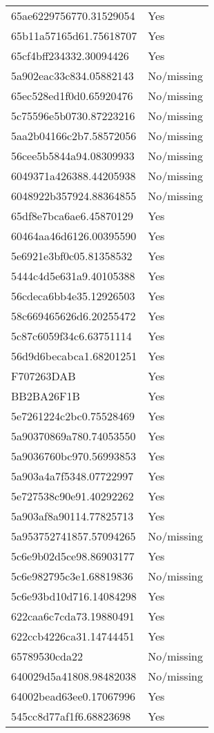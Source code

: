 \begin{tabular}{ll}
65ae6229756770.31529054 & Yes \\
65b11a57165d61.75618707 & Yes \\
65cf4bff234332.30094426 & Yes \\
5a902eac33c834.05882143 & No/missing \\
65ec528ed1f0d0.65920476 & No/missing \\
5c75596e5b0730.87223216 & No/missing \\
5aa2b04166c2b7.58572056 & No/missing \\
56cee5b5844a94.08309933 & No/missing \\
6049371a426388.44205938 & No/missing \\
6048922b357924.88364855 & No/missing \\
65df8e7bca6ae6.45870129 & Yes \\
60464aa46d6126.00395590 & Yes \\
5e6921e3bf0c05.81358532 & Yes \\
5444c4d5e631a9.40105388 & Yes \\
56cdeca6bb4e35.12926503 & Yes \\
58c669465626d6.20255472 & Yes \\
5c87c6059f34c6.63751114 & Yes \\
56d9d6becabca1.68201251 & Yes \\
F707263DAB & Yes \\
BB2BA26F1B & Yes \\
5e7261224c2bc0.75528469 & Yes \\
5a90370869a780.74053550 & Yes \\
5a9036760bc970.56993853 & Yes \\
5a903a4a7f5348.07722997 & Yes \\
5e727538c90e91.40292262 & Yes \\
5a903af8a90114.77825713 & Yes \\
5a953752741857.57094265 & No/missing \\
5c6e9b02d5ce98.86903177 & Yes \\
5c6e982795c3e1.68819836 & No/missing \\
5c6e93bd10d716.14084298 & Yes \\
622caa6c7cda73.19880491 & Yes \\
622ccb4226ca31.14744451 & Yes \\
65789530cda22 & No/missing \\
640029d5a41808.98482038 & No/missing \\
64002bead63ee0.17067996 & Yes \\
545cc8d77af1f6.68823698 & Yes \\

\end{tabular}
